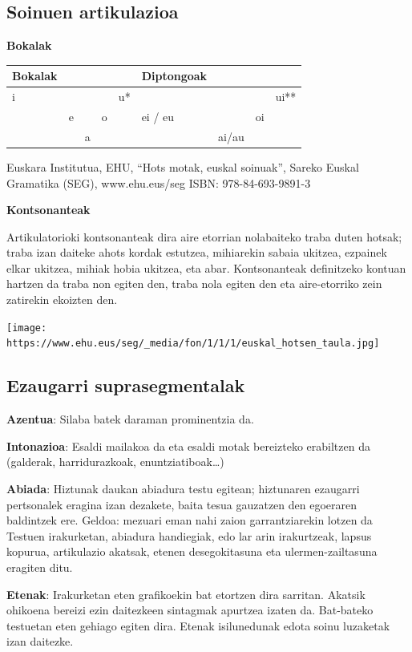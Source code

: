 \documentclass[
]{book}
\begin{document}
\hypertarget{soinuen-artikulazioa}{%
\subsection{Soinuen artikulazioa}\label{soinuen-artikulazioa}}

\textbf{Bokalak}

\begin{longtable}[]{@{}lllllllll@{}}
\toprule
\textbf{Bokalak} & & & & & \textbf{Diptongoak} & & &\tabularnewline
\midrule
\endhead
i & & & & u* & & & & ui**\tabularnewline
& e & & o & & ei / eu & & oi &\tabularnewline
& & a & & & & ai/au & &\tabularnewline
\bottomrule
\end{longtable}

Euskara Institutua, EHU, ``Hots motak, euskal soinuak'', Sareko Euskal Gramatika (SEG), www.ehu.eus/seg
ISBN: 978-84-693-9891-3

\textbf{Kontsonanteak}

Artikulatorioki kontsonanteak dira aire etorrian nolabaiteko traba duten hotsak; traba izan daiteke ahots kordak estutzea, mihiarekin sabaia ukitzea, ezpainek elkar ukitzea, mihiak hobia ukitzea, eta abar. Kontsonanteak definitzeko kontuan hartzen da traba non egiten den, traba nola egiten den eta aire-etorriko zein zatirekin ekoizten den.

\texttt{[image: https://www.ehu.eus/seg/\_media/fon/1/1/1/euskal\_hotsen\_taula.jpg]}

\hypertarget{ezaugarri-suprasegmentalak}{%
\subsection{Ezaugarri suprasegmentalak}\label{ezaugarri-suprasegmentalak}}

\textbf{Azentua}: Silaba batek daraman prominentzia da.

\textbf{Intonazioa}: Esaldi mailakoa da eta esaldi motak bereizteko erabiltzen da (galderak, harridurazkoak, enuntziatiboak\ldots)

\textbf{Abiada}: Hiztunak daukan abiadura testu egitean; hiztunaren ezaugarri pertsonalek eragina izan dezakete, baita tesua gauzatzen den egoeraren baldintzek ere.
Geldoa: mezuari eman nahi zaion garrantziarekin lotzen da
Testuen irakurketan, abiadura handiegiak, edo lar arin irakurtzeak, lapsus kopurua, artikulazio akatsak, etenen desegokitasuna eta ulermen-zailtasuna eragiten ditu.

\textbf{Etenak}: Irakurketan eten grafikoekin bat etortzen dira sarritan.
Akatsik ohikoena bereizi ezin daitezkeen sintagmak apurtzea izaten da.
Bat-bateko testuetan eten gehiago egiten dira.
Etenak isilunedunak edota soinu luzaketak izan daitezke.
\end{document}
